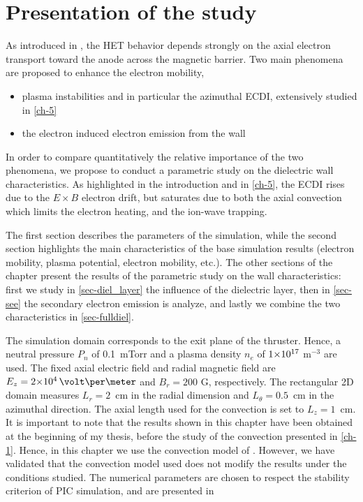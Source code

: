 
\section{Presentation of the study}
  \label{sec-params}
  
  
  
  As introduced in , the \ac{HET} behavior depends strongly on the axial electron transport toward the anode across the magnetic barrier.
  Two main phenomena are proposed to enhance the electron mobility,
  \begin{itemize}
    \item plasma instabilities and in particular the azimuthal \ac{ECDI}, extensively studied in \cref{ch-5}
    \item the electron induced electron emission from the wall
  \end{itemize}
  In order to compare quantitatively the relative importance of the two phenomena, we propose to conduct a parametric study on the dielectric wall characteristics.
  As highlighted in the introduction and in \cref{ch-5}, the \ac{ECDI} rises due to the $E \times B$ electron drift, but saturates due to both the axial convection which limits the electron heating, and the ion-wave trapping.
  
  The first section describes the parameters of the simulation, 
  while the second section highlights the main characteristics of the base simulation results (electron mobility, plasma potential, electron mobility, etc.).
  The other sections of the chapter present the results of the parametric study on the wall characteristics\string: first we study in \cref{sec-diel_layer} the influence of the dielectric layer, then in \cref{sec-see} the secondary electron emission is analyze, and lastly we combine the two characteristics in \cref{sec-fulldiel}.

  The simulation domain corresponds to the exit plane of the thruster.
  Hence, a neutral pressure $P_n$ of 0.1~mTorr and a plasma density $n_e$ of ${{1}{\times}10^{17}}$ m$^{-3}$ are used.
  The fixed axial electric field and radial magnetic field are $E_z=\sn{2}{4}\,\volt\per\meter$ and $B_r=200$ G, respectively.
  The rectangular \acs{2D} domain measures $L_r=2$~cm in the radial dimension and $L_{\theta}=0.5$~cm in the azimuthal direction.
  The axial length used for the convection is set to $L_z=1$~cm.
  It is important to note that the results shown in this chapter have been obtained at the beginning of my thesis, before the study of the convection presented in \cref{ch-1}.
  Hence, in this chapter we use the convection model of \citet{lafleur2016a}.
  However, we have validated that the convection model used does not modify the results under the conditions studied.
  The numerical parameters are chosen to respect the stability criterion of \ac{PIC} simulation, and are presented in 
  
